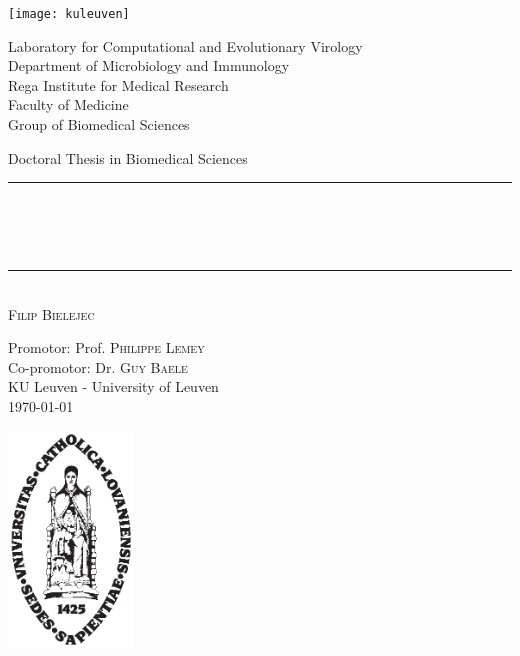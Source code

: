 \begin{titlepage}
	\begin{addmargin}[-1cm]{-3cm}
    \begin{center}
    
    
    \texttt{[image: kuleuven]}
    
    
        \large
        Laboratory for Computational and Evolutionary Virology\\ 
        Department of Microbiology and Immunology\\        
        Rega Institute for Medical Research\\
        Faculty of Medicine\\
        Group of Biomedical Sciences\\

        \vfill

        Doctoral Thesis in Biomedical Sciences\\ \vskip1cm
        \rule{14cm}{0.4pt}\\ \bigskip
        \begingroup
            \Large
            \color{maroon}\spacedallcaps{\myTitle} \\ \bigskip
        \endgroup
        \spacedlowsmallcaps{\mySubtitle} \\ \bigskip
        \rule{14cm}{0.4pt}\\ \vskip1cm
        \textsc{Filip Bielejec}

        \vfill
        \vfill
        \vfill

        \hfill Promotor: Prof. \textsc{Philippe Lemey}\\
        \hfill Co-promotor: Dr. \textsc{Guy Baele}\\
        \hfill KU Leuven - University of Leuven\\
        \hfill \today
    \end{center}
    \vspace{-3.5cm}\includegraphics[width=0.25\textwidth]{figures/sedes}
  \end{addmargin}
\end{titlepage}
